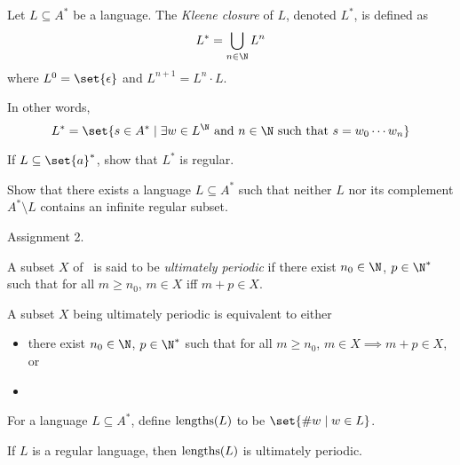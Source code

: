 
\begin{definition}
    Let $L \subseteq A^*$ be a language.
    The \emph{Kleene closure} of $L$, denoted $L^*$, is defined as \[
        L^* = \bigcup_{n \in \N} L^n
    \] where $L^0 = \set{\epsilon}$ and $L^{n+1} = L^n \cdot L$.
\end{definition}
In other words, \[
    L^* = \set{s \in A^* \mid \exists w \in L^\N \text{ and }
        n \in \N \text{ such that } s = w_0 \cdots w_n}
\]
\begin{exercise}
    If $L \subseteq \set{a}^*$, show that $L^*$ is regular.
\end{exercise}
\begin{exercise}
    Show that there exists a language $L \subseteq A^*$ such that neither
    $L$ nor its complement $A^* \setminus L$ contains an infinite regular
    subset.
\end{exercise}
\begin{solution}
    Assignment 2.
\end{solution}

\begin{definition} \label{def:ultimate_periodicity}
    A subset $X$ of \N\ is said to be \emph{ultimately periodic} if there
    exist $n_0 \in \N$, $p \in \N^*$ such that for all $m \ge n_0$,
    $m \in X$ iff $m + p \in X$.
\end{definition}
\begin{proposition}
    A subset $X$ being ultimately periodic is equivalent to either
    \begin{itemize}
        \item there exist $n_0 \in \N$, $p \in \N^*$ such that for all
            $m \ge n_0$, $m \in X \implies m + p \in X$, or
        \item 
    \end{itemize}
\end{proposition}

\begin{definition}
    For a language $L \subseteq A^*$, define $\operatorname{lengths}(L)$ to be
    $\set{\size w \mid w \in L}$.
\end{definition}
\begin{theorem}
    If $L$ is a regular language, then $\operatorname{lengths}(L)$ is ultimately periodic.
\end{theorem}
